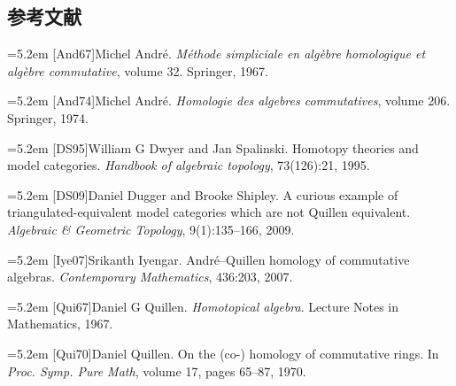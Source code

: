 \subsection*{参考文献}
\par\noindent\hangindent=5.2em [And67]\hspace{0.6em}Michel Andr\'e. \emph{M\'ethode simpliciale en alg\`ebre homologique et alg\`ebre commutative}, volume 32. Springer, 1967.
\par\noindent\hangindent=5.2em [And74]\hspace{0.6em}Michel Andr\'e. \emph{Homologie des algebres commutatives}, volume 206. Springer, 1974.
\par\noindent\hangindent=5.2em [DS95]\hspace{0.6em}William G Dwyer and Jan Spalinski. Homotopy theories and model categories. \emph{Handbook of algebraic topology}, 73(126):21, 1995.
\par\noindent\hangindent=5.2em [DS09]\hspace{0.6em}Daniel Dugger and Brooke Shipley. A curious example of triangulated-equivalent model categories which are not Quillen equivalent. \emph{Algebraic \& Geometric Topology}, 9(1):135--166, 2009.
\par\noindent\hangindent=5.2em [Iye07]\hspace{0.6em}Srikanth Iyengar. Andr\'e--Quillen homology of commutative algebras. \emph{Contemporary Mathematics}, 436:203, 2007.
\par\noindent\hangindent=5.2em [Qui67]\hspace{0.6em}Daniel G Quillen. \emph{Homotopical algebra}. Lecture Notes in Mathematics, 1967.
\par\noindent\hangindent=5.2em [Qui70]\hspace{0.6em}Daniel Quillen. On the (co-) homology of commutative rings. In \emph{Proc. Symp. Pure Math}, volume 17, pages 65--87, 1970.

